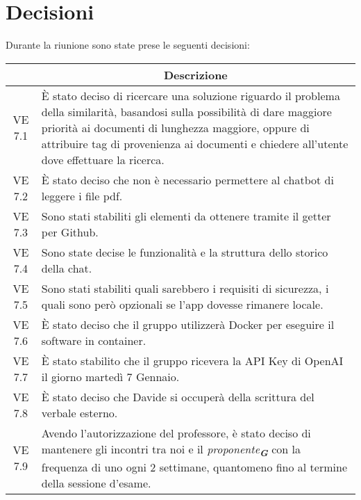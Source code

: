

\section{Decisioni}

Durante la riunione sono state prese le seguenti decisioni:

\vspace{0.5cm}

\begin{table}[htbp]
    \centering
    \begin{tabular}{|c|p{}|}
        \hline
        \rowcolor[gray]{0.75}
        \multicolumn{1}{|c|}{\textbf{Codice}} & \multicolumn{1}{|c|}{\textbf{Descrizione}}\\
        \hline
        VE 7.1 & È stato deciso di ricercare una soluzione riguardo il problema della similarità, basandosi sulla possibilità di dare maggiore priorità ai documenti di lunghezza maggiore, oppure di attribuire tag di provenienza ai documenti e chiedere all'utente dove effettuare la ricerca. \\
        VE 7.2 & È stato deciso che non è necessario permettere al chatbot di leggere i file pdf. \\
        VE 7.3 & Sono stati stabiliti gli elementi da ottenere tramite il getter per Github. \\
        VE 7.4 & Sono state decise le funzionalità e la struttura dello storico della chat. \\
        VE 7.5 & Sono stati stabiliti quali sarebbero i requisiti di sicurezza, i quali sono però opzionali se l'app dovesse rimanere locale. \\
        VE 7.6 & È stato deciso che il gruppo utilizzerà Docker per eseguire il software in container. \\
        VE 7.7 & È stato stabilito che il gruppo ricevera la API Key di OpenAI il giorno martedì 7 Gennaio. \\
        VE 7.8 & È stato deciso che Davide si occuperà della scrittura del verbale esterno. \\
        VE 7.9 & Avendo l'autorizzazione del professore, è stato deciso di mantenere gli incontri tra noi e il \emph{proponente}\textsubscript{\textbf{\textit{G}}} con la frequenza di uno ogni 2 settimane, quantomeno fino al termine della sessione d'esame. \\
        \hline
    \end{tabular}
\end{table}
